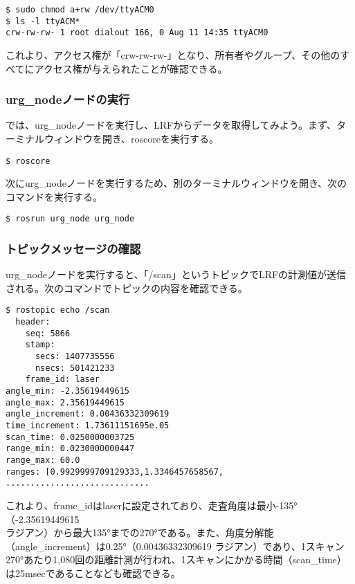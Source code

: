 \begin{lstlisting}[language=ROS]
$ sudo chmod a+rw /dev/ttyACM0
$ ls -l ttyACM*
crw-rw-rw- 1 root dialout 166, 0 Aug 11 14:35 ttyACM0
\end{lstlisting}

これより、アクセス権が「crw-rw-rw-」となり、所有者やグループ、その他のすべてにアクセス権が与えられたことが確認できる。

\subsubsection{urg\_nodeノードの実行}

では、urg\_nodeノードを実行し、LRFからデータを取得してみよう。まず、ターミナルウィンドウを開き、roscoreを実行する。

\begin{lstlisting}[language=ROS]
$ roscore
\end{lstlisting}

次にurg\_nodeノードを実行するため、別のターミナルウィンドウを開き、次のコマンドを実行する。

\begin{lstlisting}[language=ROS]
$ rosrun urg_node urg_node
\end{lstlisting}

\subsubsection{トピックメッセージの確認}

urg\_nodeノードを実行すると、「/scan」というトピックでLRFの計測値が送信される。次のコマンドでトピックの内容を確認できる。

\begin{lstlisting}[language=ROS]
$ rostopic echo /scan
  header:
    seq: 5866
    stamp:
      secs: 1407735556
      nsecs: 501421233
    frame_id: laser
angle_min: -2.35619449615
angle_max: 2.35619449615
angle_increment: 0.00436332309619
time_increment: 1.73611151695e.05
scan_time: 0.0250000003725
range_min: 0.0230000000447
range_max: 60.0
ranges: [0.9929999709129333,1.3346457658567, .............................
\end{lstlisting}

これより、frame\_idはlaserに設定されており、走査角度は最小-135°（-2.35619449615\\ラジアン）から最大135°までの270°である。また、角度分解能（angle\_increment）は0.25°（0.00436332309619 ラジアン）であり、1スキャン270°あたり1,080回の距離計測が行われ、1スキャンにかかる時間（scan\_time）は25msecであることなども確認できる。

